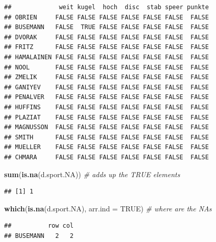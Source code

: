 \documentclass[
]{article}
\newenvironment{Shaded}{\begin{snugshade}}{\end{snugshade}}
\newcommand{\AttributeTok}[1]{\textcolor[rgb]{0.13,0.29,0.53}{#1}}
\newcommand{\CommentTok}[1]{\textcolor[rgb]{0.56,0.35,0.01}{\textit{#1}}}
\newcommand{\ConstantTok}[1]{\textcolor[rgb]{0.56,0.35,0.01}{#1}}
\newcommand{\DecValTok}[1]{\textcolor[rgb]{0.00,0.00,0.81}{#1}}
\newcommand{\FunctionTok}[1]{\textcolor[rgb]{0.13,0.29,0.53}{\textbf{#1}}}
\newcommand{\NormalTok}[1]{#1}
\newcommand{\OtherTok}[1]{\textcolor[rgb]{0.56,0.35,0.01}{#1}}
\newcommand{\SpecialCharTok}[1]{\textcolor[rgb]{0.81,0.36,0.00}{\textbf{#1}}}
\begin{document}
\begin{verbatim}
##             weit kugel  hoch  disc  stab speer punkte
## OBRIEN     FALSE FALSE FALSE FALSE FALSE FALSE  FALSE
## BUSEMANN   FALSE  TRUE FALSE FALSE FALSE FALSE  FALSE
## DVORAK     FALSE FALSE FALSE FALSE FALSE FALSE  FALSE
## FRITZ      FALSE FALSE FALSE FALSE FALSE FALSE  FALSE
## HAMALAINEN FALSE FALSE FALSE FALSE FALSE FALSE  FALSE
## NOOL       FALSE FALSE FALSE FALSE FALSE FALSE  FALSE
## ZMELIK     FALSE FALSE FALSE FALSE FALSE FALSE  FALSE
## GANIYEV    FALSE FALSE FALSE FALSE FALSE FALSE  FALSE
## PENALVER   FALSE FALSE FALSE FALSE FALSE FALSE  FALSE
## HUFFINS    FALSE FALSE FALSE FALSE FALSE FALSE  FALSE
## PLAZIAT    FALSE FALSE FALSE FALSE FALSE FALSE  FALSE
## MAGNUSSON  FALSE FALSE FALSE FALSE FALSE FALSE  FALSE
## SMITH      FALSE FALSE FALSE FALSE FALSE FALSE  FALSE
## MUELLER    FALSE FALSE FALSE FALSE FALSE FALSE  FALSE
## CHMARA     FALSE FALSE FALSE FALSE FALSE FALSE  FALSE
\end{verbatim}

\begin{Shaded}
\begin{Highlighting}[]
\FunctionTok{sum}\NormalTok{(}\FunctionTok{is.na}\NormalTok{(d.sport.NA)) }\CommentTok{\# adds up the TRUE elements}
\end{Highlighting}
\end{Shaded}

\begin{verbatim}
## [1] 1
\end{verbatim}

\begin{Shaded}
\begin{Highlighting}[]
\FunctionTok{which}\NormalTok{(}\FunctionTok{is.na}\NormalTok{(d.sport.NA), }\AttributeTok{arr.ind =} \ConstantTok{TRUE}\NormalTok{) }\CommentTok{\# where are the NA\textquotesingle{}s}
\end{Highlighting}
\end{Shaded}

\begin{verbatim}
##          row col
## BUSEMANN   2   2
\end{verbatim}

\begin{Shaded}
\end{Shaded}
\end{document}
